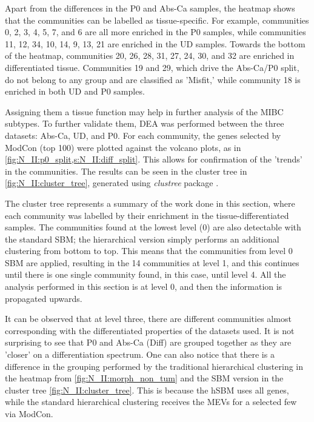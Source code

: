 Apart from the differences in the P0 and Abs-Ca samples, the heatmap shows that the communities can be labelled as tissue-specific. For example, communities 0, 2, 3, 4, 5, 7, and 6 are all more enriched in the P0 samples, while communities 11, 12, 34, 10, 14, 9, 13, 21 are enriched in the UD samples. Towards the bottom of the heatmap, communities 20, 26, 28, 31, 27, 24, 30, and 32 are enriched in differentiated tissue. Communities 19 and 29, which drive the Abs-Ca/P0 split, do not belong to any group and are classified as 'Misfit,' while community 18 is enriched in both UD and P0 samples.


Assigning them a tissue function may help in further analysis of the MIBC subtypes. To further validate them, DEA was performed between the three datasets: Abs-Ca, UD, and P0. For each community, the genes selected by ModCon (top 100) were plotted against the volcano plots, as in \cref{fig:N_II:p0_split,s:N_II:diff_split}. This allows for confirmation of the 'trends' in the communities. The results can be seen in the cluster tree in \cref{fig:N_II:cluster_tree}, generated using \textit{clustree} package \cite{Zappia2018-bt}.

The cluster tree represents a summary of the work done in this section, where each community was labelled by their enrichment in the tissue-differentiated samples. The communities found at the lowest level (0) are also detectable with the standard SBM; the hierarchical version simply performs an additional clustering from bottom to top. This means that the communities from level 0 SBM are applied, resulting in the 14 communities at level 1, and this continues until there is one single community found, in this case, until level 4. All the analysis performed in this section is at level 0, and then the information is propagated upwards.

It can be observed that at level three, there are different communities almost corresponding with the differentiated properties of the datasets used. It is not surprising to see that P0 and Abs-Ca (Diff) are grouped together as they are 'closer' on a differentiation spectrum. One can also notice that there is a difference in the grouping performed by the traditional hierarchical clustering in the heatmap from \cref{fig:N_II:morph_non_tum} and the SBM version in the cluster tree \cref{fig:N_II:cluster_tree}. This is because the hSBM uses all genes, while the standard hierarchical clustering receives the MEVs for a selected few via ModCon.


